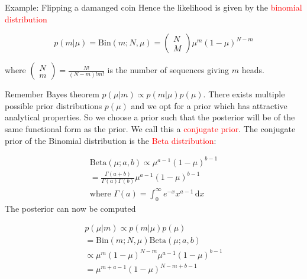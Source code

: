 \begin{example}{Example: Flipping a damanged coin}
        Hence the likelihood is given by the \textcolor{red}{binomial distribution}

        \begin{equation}
            p(m|\mu) = \text{Bin}(m;N,\mu) = \begin{pmatrix} N \\ M \end{pmatrix} \mu^{m}(1-\mu)^{N-m}
        \end{equation}

        where $\begin{pmatrix} N \\ m \end{pmatrix} = \frac{N!} {(N-m)!m!} $ is the number of sequences giving $m$ heads. 

        \vspace{1em}

        Remember Bayes theorem $p(\mu|m) \propto p(m|\mu)p(\mu)$. There exists multiple possible prior distributions $p(\mu)$ and we opt for
        a prior which has attractive analytical properties. So we choose a prior such that the posterior will be of the same functional form as the prior. We call this a \textcolor{red}{conjugate prior}.
        The conjugate prior of the Binomial distribution is the \textcolor{red}{Beta distribution}:
        
       \begin{equation}
       \begin{aligned}
        \text{Beta}(\mu; a,b ) \propto \mu^{a-1} (1-\mu)^{b-1} \\
        = \frac{\Gamma (a+b)} {\Gamma(a)\Gamma(b)} \mu^{a-1}(1-\mu)^{b-1} \\
        \text{where } \Gamma(a) = \int_{0}^{\infty} e^{-x}x^{a-1}\,\text{d}x  
       \end{aligned}
       \end{equation}
       The posterior can now be computed

       \begin{equation}
       \begin{aligned}
        p(\mu|m) \propto p(m|\mu)p(\mu) \\
        = \text{Bin} (m; N, \mu) \text{Beta}(\mu;a,b) \\
        \propto \mu^{m}(1-\mu)^{N-m}\mu^{a-1}(1-\mu)^{b-1} \\
        = \mu^{m+a-1}(1-\mu)^{N-m+b-1}
       \end{aligned}
       \end{equation}


    \end{example}

